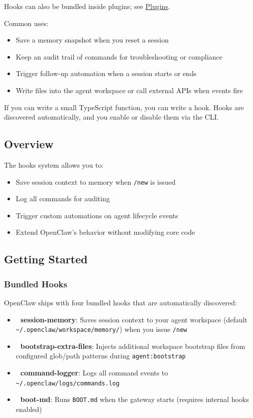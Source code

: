 Hooks can also be bundled inside plugins; see \href{/tools/plugin\#plugin-hooks}{Plugins}.

Common uses:

\begin{itemize}
  \item Save a memory snapshot when you reset a session
  \item Keep an audit trail of commands for troubleshooting or compliance
  \item Trigger follow-up automation when a session starts or ends
  \item Write files into the agent workspace or call external APIs when events fire
\end{itemize}


If you can write a small TypeScript function, you can write a hook. Hooks are discovered automatically, and you enable or disable them via the CLI.

\subsection{Overview}


The hooks system allows you to:

\begin{itemize}
  \item Save session context to memory when \texttt{/new} is issued
  \item Log all commands for auditing
  \item Trigger custom automations on agent lifecycle events
  \item Extend OpenClaw's behavior without modifying core code
\end{itemize}


\subsection{Getting Started}


\subsubsection{Bundled Hooks}


OpenClaw ships with four bundled hooks that are automatically discovered:

\begin{itemize}
  \item \textbf{💾 session-memory}: Saves session context to your agent workspace (default \texttt{\textasciitilde{}/.openclaw/workspace/memory/}) when you issue \texttt{/new}
  \item \textbf{📎 bootstrap-extra-files}: Injects additional workspace bootstrap files from configured glob/path patterns during \texttt{agent:bootstrap}
  \item \textbf{📝 command-logger}: Logs all command events to \texttt{\textasciitilde{}/.openclaw/logs/commands.log}
  \item \textbf{🚀 boot-md}: Runs \texttt{BOOT.md} when the gateway starts (requires internal hooks enabled)
\end{itemize}


